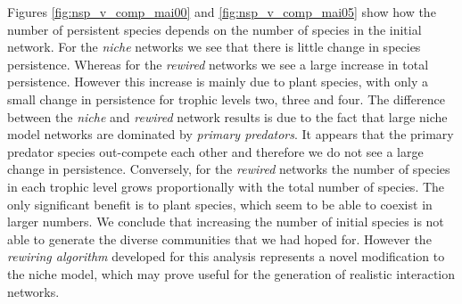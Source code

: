 Figures \ref{fig:nsp_v_comp_mai00} and \ref{fig:nsp_v_comp_mai05} show how the number of persistent species depends on the number of species in the initial network. For the \emph{niche} networks we see that there is little change in species persistence. Whereas for the \emph{rewired} networks we see a large increase in total persistence. However this increase is mainly due to plant species, with only a small change in persistence for trophic levels two, three and four. The difference between the \emph{niche} and \emph{rewired} network results is due to the fact that large niche model networks are dominated by \emph{primary predators}. It appears that the primary predator species out-compete each other and therefore we do not see a large change in persistence. Conversely, for the \emph{rewired} networks the number of species in each trophic level grows proportionally with the total number of species. The only significant benefit is to plant species, which seem to be able to coexist in larger numbers. We conclude that increasing the number of initial species is not able to generate the diverse communities that we had hoped for. However the \emph{rewiring algorithm} developed for this analysis represents a novel modification to the niche model, which may prove useful for the generation of realistic interaction networks.


